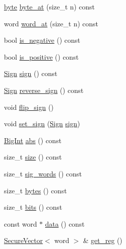 \begin{DoxyCompactItemize}
\item 
\hyperlink{namespaceBotan_a7d793989d801281df48c6b19616b8b84}{byte} \hyperlink{classBotan_1_1BigInt_a5d745b26e21ec724627b5e1c3f47cbe0}{byte\-\_\-at} (size\-\_\-t n) const 
\item 
word \hyperlink{classBotan_1_1BigInt_a52ef1c3b7144427f6f1b4dde9943ecbb}{word\-\_\-at} (size\-\_\-t n) const 
\item 
bool \hyperlink{classBotan_1_1BigInt_ad689e1c8bbd064075dda4471098348fc}{is\-\_\-negative} () const 
\item 
bool \hyperlink{classBotan_1_1BigInt_ac354be0a6907fa9b4c5e97c6ee4c6fa9}{is\-\_\-positive} () const 
\item 
\hyperlink{classBotan_1_1BigInt_ad4cc39c2c247db669ac07e5501dbf84d}{Sign} \hyperlink{classBotan_1_1BigInt_a0a2e903bb0bb3b65e1a399ad52999e91}{sign} () const 
\item 
\hyperlink{classBotan_1_1BigInt_ad4cc39c2c247db669ac07e5501dbf84d}{Sign} \hyperlink{classBotan_1_1BigInt_a39dac8e1c7449e0323916fc22daaf2e6}{reverse\-\_\-sign} () const 
\item 
void \hyperlink{classBotan_1_1BigInt_a5c510d3b6843f0ed85c96e500abeca35}{flip\-\_\-sign} ()
\item 
void \hyperlink{classBotan_1_1BigInt_aff5818294dfde352f2930e64c3d432a9}{set\-\_\-sign} (\hyperlink{classBotan_1_1BigInt_ad4cc39c2c247db669ac07e5501dbf84d}{Sign} \hyperlink{classBotan_1_1BigInt_a0a2e903bb0bb3b65e1a399ad52999e91}{sign})
\item 
\hyperlink{classBotan_1_1BigInt}{Big\-Int} \hyperlink{classBotan_1_1BigInt_a0861df703de011bf5f47954403ab514a}{abs} () const 
\item 
size\-\_\-t \hyperlink{classBotan_1_1BigInt_a69c742caf479170576e990491eaecf2b}{size} () const 
\item 
size\-\_\-t \hyperlink{classBotan_1_1BigInt_af644aebd2edeb487e9ea5f4d46283809}{sig\-\_\-words} () const 
\item 
size\-\_\-t \hyperlink{classBotan_1_1BigInt_a8a79a95801b88a44334115b85ce1bc63}{bytes} () const 
\item 
size\-\_\-t \hyperlink{classBotan_1_1BigInt_a8d564c135af2ab5e65f7b634773727c4}{bits} () const 
\item 
const word $\ast$ \hyperlink{classBotan_1_1BigInt_af819e16e6442b6e2648b01ac875a5663}{data} () const 
\item 
\hyperlink{classBotan_1_1SecureVector}{Secure\-Vector}$<$ word $>$ \& \hyperlink{classBotan_1_1BigInt_a162cd2cf0feb89ba1e2a6ef9e0dba0d0}{get\-\_\-reg} ()

\end{DoxyCompactItemize}
